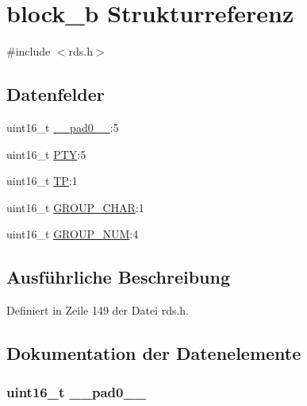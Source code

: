 \hypertarget{structblock__b}{}\section{block\+\_\+b Strukturreferenz}
\label{structblock__b}


{\ttfamily \#include $<$rds.\+h$>$}

\subsection*{Datenfelder}
\begin{DoxyCompactItemize}
\item 
uint16\+\_\+t \hyperlink{structblock__b_a77132c2c26a75f5b8751b235cda23828}{\+\_\+\+\_\+pad0\+\_\+\+\_\+}\+:5
\item 
uint16\+\_\+t \hyperlink{structblock__b_a0474967478fbbc2c71b800d2e0132d45}{P\+T\+Y}\+:5
\item 
uint16\+\_\+t \hyperlink{structblock__b_ab9e634c63b0d95a96716d5f6d7f06d72}{T\+P}\+:1
\item 
uint16\+\_\+t \hyperlink{structblock__b_a66d4119990dc4c3e040a43885e9bb953}{G\+R\+O\+U\+P\+\_\+\+C\+H\+A\+R}\+:1
\item 
uint16\+\_\+t \hyperlink{structblock__b_a9f692e9f76ee88348d426bcd4e9bc70b}{G\+R\+O\+U\+P\+\_\+\+N\+U\+M}\+:4
\end{DoxyCompactItemize}


\subsection{Ausführliche Beschreibung}


Definiert in Zeile 149 der Datei rds.\+h.



\subsection{Dokumentation der Datenelemente}
\hypertarget{structblock__b_a77132c2c26a75f5b8751b235cda23828}{}
\subsubsection[{\+\_\+\+\_\+pad0\+\_\+\+\_\+}]{\setlength{\rightskip}{0pt plus 5cm}uint16\+\_\+t \+\_\+\+\_\+pad0\+\_\+\+\_\+}\label{structblock__b_a77132c2c26a75f5b8751b235cda23828}


